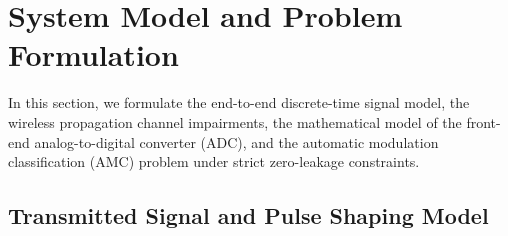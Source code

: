 
\section{System Model and Problem Formulation}
\label{sec:system_model}

In this section, we formulate the end-to-end discrete-time signal model, the wireless propagation channel impairments, the mathematical model of the front-end analog-to-digital converter (ADC), and the automatic modulation classification (AMC) problem under strict zero-leakage constraints.

\subsection{Transmitted Signal and Pulse Shaping Model}
\label{subsec:tx_signal}

